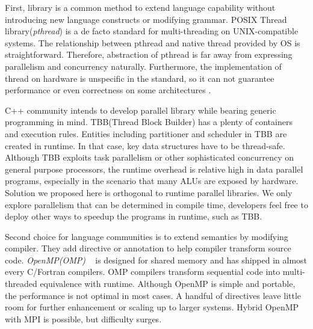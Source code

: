 \documentclass[10pt, conference, compsocconf]{IEEEtran}
\begin{document}
First, library is a common method to extend language capability
without introducing new language constructs or modifying
grammar. POSIX Thread library(\emph{pthread}) is a de facto standard for
multi-threading on UNIX-compatible systems. The relationship between pthread and native thread provided by OS is straightforward. Therefore, abstraction of pthread is far away from expressing parallelism and concurrency naturally. Furthermore, the implementation of thread on hardware is unspecific in the standard, so it can not guarantee performance or even correctness on some architectures \cite{b4, b5}.

C++ community intends to develop parallel library while bearing generic programming in mind. TBB(Thread Block Builder) has a plenty of containers and execution rules. Entities including partitioner and scheduler in TBB are created in runtime. In that case, key data structures have to be thread-safe. Although TBB exploits task parallelism or other sophisticated concurrency on general purpose processors, the runtime overhead is relative high in data parallel programs, especially in the scenario that many ALUs are exposed by hardware. Solution we proposed here is orthogonal to runtime parallel libraries. We only explore parallelism that can be determined in compile time, developers feel free to deploy other ways to speedup the programs in runtime, such as TBB.
 

Second choice for language communities is to extend semantics by
modifying compiler. They add directive or annotation to help compiler
transform source code. \emph{OpenMP(OMP)} ~\cite{b20} is designed for shared memory and has shipped in almost every C/Fortran compilers. OMP compilers transform sequential code into multi-threaded equivalence with runtime. Although OpenMP is simple and portable, the performance is not optimal in most cases. A handful of directives leave little room for further enhancement or scaling up to larger systems. Hybrid OpenMP with MPI is possible, but difficulty surges.
\end{document}
